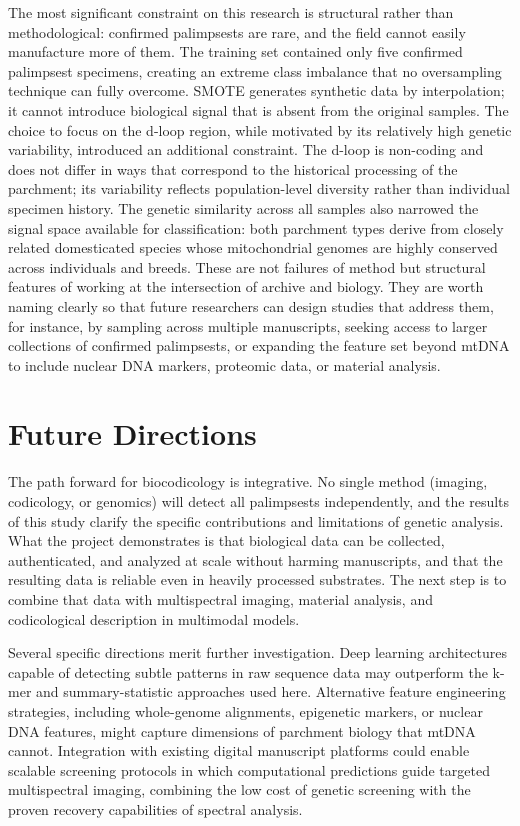 \documentclass[final]{anthology-ch} %
\begin{document}
The most significant constraint on this research is structural rather than methodological: confirmed palimpsests are rare, and the field cannot easily manufacture more of them. The training set contained only five confirmed palimpsest specimens, creating an extreme class imbalance that no oversampling technique can fully overcome. SMOTE generates synthetic data by interpolation; it cannot introduce biological signal that is absent from the original samples. The choice to focus on the d-loop region, while motivated by its relatively high genetic variability, introduced an additional constraint. The d-loop is non-coding and does not differ in ways that correspond to the historical processing of the parchment; its variability reflects population-level diversity rather than individual specimen history. The genetic similarity across all samples also narrowed the signal space available for classification: both parchment types derive from closely related domesticated species whose mitochondrial genomes are highly conserved across individuals and breeds. These are not failures of method but structural features of working at the intersection of archive and biology. They are worth naming clearly so that future researchers can design studies that address them, for instance, by sampling across multiple manuscripts, seeking access to larger collections of confirmed palimpsests, or expanding the feature set beyond mtDNA to include nuclear DNA markers, proteomic data, or material analysis.

\section{Future Directions} \label{sec:future}

The path forward for biocodicology is integrative. No single method (imaging, codicology, or genomics) will detect all palimpsests independently, and the results of this study clarify the specific contributions and limitations of genetic analysis. What the project demonstrates is that biological data can be collected, authenticated, and analyzed at scale without harming manuscripts, and that the resulting data is reliable even in heavily processed substrates. The next step is to combine that data with multispectral imaging, material analysis, and codicological description in multimodal models.

Several specific directions merit further investigation. Deep learning architectures capable of detecting subtle patterns in raw sequence data may outperform the k-mer and summary-statistic approaches used here. Alternative feature engineering strategies, including whole-genome alignments, epigenetic markers, or nuclear DNA features, might capture dimensions of parchment biology that mtDNA cannot. Integration with existing digital manuscript platforms could enable scalable screening protocols in which computational predictions guide targeted multispectral imaging, combining the low cost of genetic screening with the proven recovery capabilities of spectral analysis.
\end{document}
